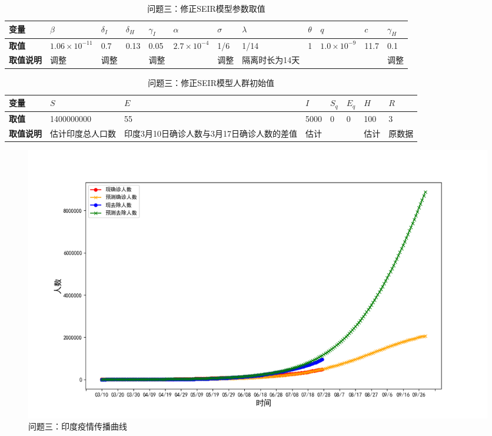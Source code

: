 \documentclass[withoutpre]{cumcmthesis} %
\begin{document}
\begin{table}[H]\small
    \caption{问题三：修正SEIR模型参数取值}
    \label{tab:intipara2} \centering
    \begin{tabular}{p{1cm}p{0.7cm}p{0.7cm}p{0.7cm}p{0.7cm}p{0.7cm}p{0.7cm}p{1.5cm}p{0.7cm}p{0.7cm}p{0.7cm}p{0.7cm}}
        \toprule[1.5pt]
        \textbf{变量} & $\beta$ & $\delta_I$ & $\delta_H$ & $\gamma_I$ & $\alpha$ & $\sigma $ & $\lambda$ &$\theta$&$q$&$c$&$\gamma_H$\\
        \midrule[1pt]
        \textbf{取值} & $1.06 \times 10^{-11}$ & 0.7& 0.13& 0.05& $ 2.7 \times 10^{-4} $ & 1/6& 1/14&1&$1.0 \times 10^{-9}$&11.7&0.1\\
        \textbf{取值说明} &  调整&  调整&  \cite{reference1}&  调整&  \cite{reference2}&调整 & 隔离时长为14天& \cite{reference4}& \cite{reference4}& \cite{reference4}&调整\\
        \bottomrule[1.5pt]
    \end{tabular}
\end{table}

\begin{table}[H]\small
    \caption{问题三：修正SEIR模型人群初始值}
    \label{tab:initvalue2} \centering
    \begin{tabular}{p{1.5cm}p{2cm}p{3cm}p{1cm}p{1cm}p{1cm}p{1cm}p{1cm}}
        \toprule[1.5pt]
        \textbf{变量} & $S$ & $E$ & $I$ & $S_q$ & $E_q$ & $H$ & $R$  \\
        \midrule[1pt]
        \textbf{取值} & 1400000000& 55& 5000 &0& 0& 100&3 \\
        \textbf{取值说明} & 估计印度总人口数& 印度3月10日确诊人数与3月17日确诊人数的差值&  估计&  \cite{reference4} &  \cite{reference4}& 估计 &  原数据\\
        \bottomrule[1.5pt]
    \end{tabular}
\end{table}

\begin{figure}[!h]
    \centering
    \includegraphics[width=1.0\textwidth]{figures/IndiaModel.png}
    \caption{问题三：印度疫情传播曲线}
    \label{fig:IndiaModel}
\end{figure}
\end{document}
